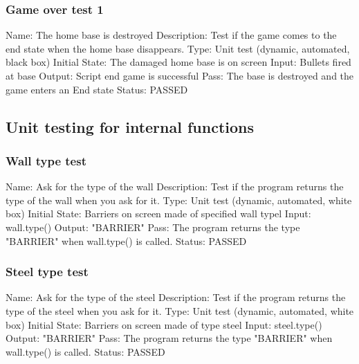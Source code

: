 \documentclass{article}
\begin{document}
\subsubsection{Game over test 1}
\label{sec:3.1.28}
Name:  The home base is destroyed\newline
Description: Test if the game comes to the end state when the home base 
disappears. \newline
Type: Unit test (dynamic, automated, black box) \newline
Initial State:  The damaged home base is on screen \newline
Input: Bullets fired at base\newline
Output: Script end game is successful\newline
Pass:  The base is destroyed and the game enters an End state \newline
\newline Status: PASSED


\subsection{Unit testing for internal functions}

\subsubsection{Wall type test}
\label{sec:3.2.1}
Name:  Ask for the type of the wall\newline
Description: Test if the program returns the type of the wall when you ask for 
it. \newline
Type: Unit test (dynamic, automated, white box) \newline
Initial State:  Barriers on screen made of specified wall typel \newline
Input: wall.type()\newline
Output: "BARRIER"  \newline
Pass:   The program returns the type "BARRIER" when wall.type() is called. 
\newline
\newline Status: PASSED

\subsubsection{Steel type test}
\label{sec:3.2.2}
Name:  Ask for the type of the steel\newline
Description: Test if the program returns the type of the steel when you ask for 
it. \newline
Type: Unit test (dynamic, automated, white box) \newline
Initial State:  Barriers on screen made of type steel \newline
Input: steel.type()\newline
Output: "BARRIER"  \newline
Pass:  The program returns the type "BARRIER" when wall.type() is called. 
\newline
\newline Status: PASSED
\end{document}
